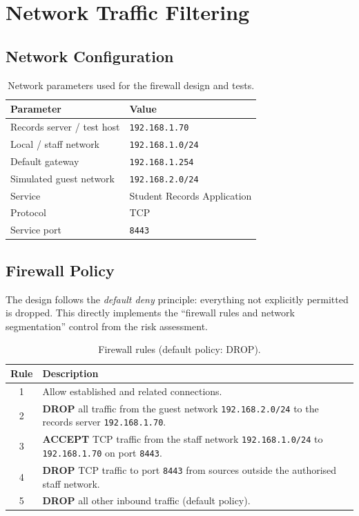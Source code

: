 \documentclass[11pt,a4paper]{article}
\begin{document}
\section{Network Traffic Filtering}\label{sec:firewall}

\subsection{Network Configuration}
\begin{table}[h!]
\centering
\renewcommand{\arraystretch}{1.3}
\begin{tabular}{@{}l l@{}}
\toprule
\textbf{Parameter} & \textbf{Value} \\
\midrule
Records server / test host & \texttt{192.168.1.70} \\
Local / staff network      & \texttt{192.168.1.0/24} \\
Default gateway            & \texttt{192.168.1.254} \\
Simulated guest network    & \texttt{192.168.2.0/24} \\
Service                    & Student Records Application \\
Protocol                   & TCP \\
Service port               & \texttt{8443} \\
\bottomrule
\end{tabular}
\caption{Network parameters used for the firewall design and tests.}
\end{table}

\subsection{Firewall Policy}
The design follows the \textit{default deny} principle: everything not explicitly
permitted is dropped. This directly implements the ``firewall rules and network
segmentation'' control from the risk assessment.

\begin{table}[h!]
\centering
\renewcommand{\arraystretch}{1.3}
\begin{tabular}{@{}c p{10.5cm}@{}}
\toprule
\textbf{Rule} & \textbf{Description} \\
\midrule
1 & Allow established and related connections. \\
2 & \textbf{DROP} all traffic from the guest network \texttt{192.168.2.0/24} to the records server \texttt{192.168.1.70}. \\
3 & \textbf{ACCEPT} TCP traffic from the staff network \texttt{192.168.1.0/24} to \texttt{192.168.1.70} on port \texttt{8443}. \\
4 & \textbf{DROP} TCP traffic to port \texttt{8443} from sources outside the authorised staff network. \\
5 & \textbf{DROP} all other inbound traffic (default policy). \\
\bottomrule
\end{tabular}
\caption{Firewall rules (default policy: DROP).}
\end{table}
\end{document}
